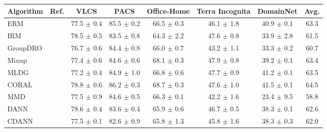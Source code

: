 \begin{table}[t]
\small
\centering
\begin{tabular}{llcccccc}
\toprule
\textbf{Algorithm}  & \textbf{Ref.}       & \textbf{VLCS}             & \textbf{PACS}             & \textbf{Office-Home}       & \textbf{Terra Incognita}   & \textbf{DomainNet}        & \textbf{Avg.}              \\
\midrule
ERM                       & \citep{vapnik1998statistical}            & 77.5 $\pm$ 0.4            & 85.5 $\pm$ 0.2            & 66.5 $\pm$ 0.3            & 46.1 $\pm$ 1.8            & 40.9 $\pm$ 0.1            & 63.3                     \\
IRM                       & \citep{arjovsky2019invariant}             & 78.5 $\pm$ 0.5            & 83.5 $\pm$ 0.8            & 64.3 $\pm$ 2.2            & 47.6 $\pm$ 0.8            & 33.9 $\pm$ 2.8            & 61.5                      \\
GroupDRO                  & \citep{sagawa2019distributionally}        & 76.7 $\pm$ 0.6            & 84.4 $\pm$ 0.8            & 66.0 $\pm$ 0.7            & 43.2 $\pm$ 1.1            & 33.3 $\pm$ 0.2            & 60.7                      \\
Mixup                     & \citep{yan2020improve}            & 77.4 $\pm$ 0.6            & 84.6 $\pm$ 0.6            & 68.1 $\pm$ 0.3            & 47.9 $\pm$ 0.8            & 39.2 $\pm$ 0.1            & 63.4                      \\
MLDG                      & \citep{LiYSH18}            & 77.2 $\pm$ 0.4            & 84.9 $\pm$ 1.0            & 66.8 $\pm$ 0.6            & 47.7 $\pm$ 0.9            & 41.2 $\pm$ 0.1            & 63.5                      \\
CORAL                     &  \citep{SunS16}             & 78.8 $\pm$ 0.6            & 86.2 $\pm$ 0.3            & 68.7 $\pm$ 0.3            & 47.6 $\pm$ 1.0            & 41.5 $\pm$ 0.1            & 64.5                      \\
MMD                       & \citep{LiPWK18}           & 77.5 $\pm$ 0.9            & 84.6 $\pm$ 0.5            & 66.3 $\pm$ 0.1            & 42.2 $\pm$ 1.6            & 23.4 $\pm$ 9.5            & 58.8                      \\
DANN                      & \citep{GaninUAGLLML16}         & 78.6 $\pm$ 0.4            & 83.6 $\pm$ 0.4            & 65.9 $\pm$ 0.6            & 46.7 $\pm$ 0.5            & 38.3 $\pm$ 0.1            & 62.6                      \\
CDANN                     & \citep{LiGTLT18}          & 77.5 $\pm$ 0.1            & 82.6 $\pm$ 0.9            & 65.8 $\pm$ 1.3            & 45.8 $\pm$ 1.6            & 38.3 $\pm$ 0.3            & 62.0                      \\

\end{tabular}
\end{table}
